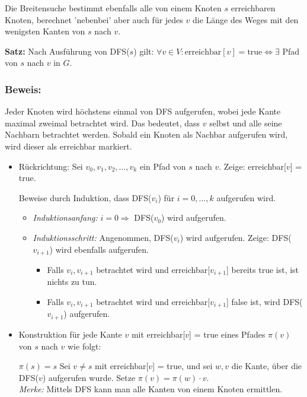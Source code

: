 \documentclass{article}
\begin{document}
Die Breitensuche bestimmt ebenfalls alle von einem Knoten $s$ erreichbaren Knoten, berechnet 'nebenbei' aber auch für jedes $v$ die Länge des Weges mit den wenigsten Kanten von $s$ nach $v$.

\textbf{Satz:} Nach Ausführung von DFS($s$) gilt: $\forall v \in V: \text{erreichbar}[v] = \text{true} \Leftrightarrow \exists$ Pfad von $s$ nach $v$ in $G$.

\subsubsection{Beweis:}  
Jeder Knoten wird höchstens einmal von DFS aufgerufen, wobei jede Kante maximal zweimal betrachtet wird. Das bedeutet, dass $v$ selbst und alle seine Nachbarn betrachtet werden. Sobald ein Knoten als Nachbar aufgerufen wird, wird dieser als erreichbar markiert.

\begin{itemize}
    \item Rückrichtung: Sei $v_0, v_1, v_2, \dots, v_k$ ein Pfad von $s$ nach $v$. Zeige: erreichbar[$v$] = true.

    Beweise durch Induktion, dass DFS($v_i$) für $i = 0, \dots, k$ aufgerufen wird.

    \begin{itemize}
        \item \textit{Induktionsanfang:} $i = 0 \Rightarrow$ DFS($v_0$) wird aufgerufen.
        \item \textit{Induktionsschritt:} Angenommen, DFS($v_i$) wird aufgerufen. Zeige: DFS($v_{i+1}$) wird ebenfalls aufgerufen.

        \begin{itemize}
            \item Falls {$v_i, v_{i+1}$} betrachtet wird und erreichbar[$v_{i+1}$] bereits true ist, ist nichts zu tun.
            \item Falls {$v_i, v_{i+1}$} betrachtet wird und erreichbar[$v_{i+1}$] false ist, wird DFS($v_{i+1}$) aufgerufen.
        \end{itemize}
    \end{itemize}

    \item Konstruktion für jede Kante $v$ mit erreichbar[$v$] = true eines Pfades $\pi(v)$ von $s$ nach $v$ wie folgt:  

    $\pi(s) = s$  
    Sei $v \neq s$ mit erreichbar[$v$] = true, und sei {$w, v$} die Kante, über die DFS($v$) aufgerufen wurde. Setze $\pi(v) = \pi(w) \cdot v$. \\
    \textit{Merke: }Mittels DFS kann man alle Kanten von einem Knoten ermittlen.
\end{itemize}
\end{document}
